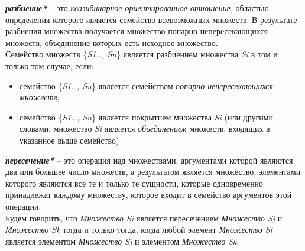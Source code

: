 \begin{SCn}
\end{SCn}
	
\textbf{\textit{разбиение*}} – это \textit{квазибинарное ориентированное отношение}, областью определения которого является семейство всевозможных множеств. В результате разбиения множества получается множество попарно непересекающихся множеств, объединение которых есть исходное множество.\\
Семейство множеств \{\textit{S1…, Sn}\} является разбиением множества \textit{Si} в том и только том случае, если:
\begin{itemize}
		\item семейство \{\textit{S1…, Sn}\} является семейством \textit{попарно непересекающихся множеств};
		\item семейство \{\textit{S1…, Sn}\} является покрытием множества \textit{Si} (или другими словами, множество \textit{Si} является \textit{объединением} множеств, входящих в указанное выше семейство)
\end{itemize}

\begin{SCn}
\end{SCn}

\textbf{\textit{пересечение*}} – это операция над множествами, аргументами которой являются два или большее число множеств, а результатом является множество, элементами которого являются все те и только те сущности, которые одновременно принадлежат каждому множеству, которое входит в семейство аргументов этой операции.\\
	Будем говорить, что \textit{Множество Si} является пересечением \textit{Множество Sj} и \textit{Множество Sk} тогда и только тогда, когда любой элемент \textit{Множество Si} является элементом \textit{Множество Sj} и элементом \textit{Множество Sk}.

